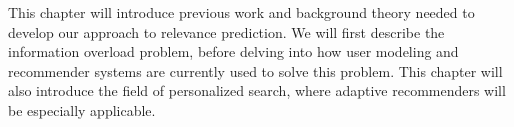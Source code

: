 \label{chap:theory}

This chapter will introduce previous work and background theory needed to develop our approach to relevance prediction.
We will first describe the information overload problem, before delving into
how user modeling and recommender systems are currently used to solve this problem.
This chapter will also introduce the field of personalized search, 
where adaptive recommenders will be especially applicable.








 
%



